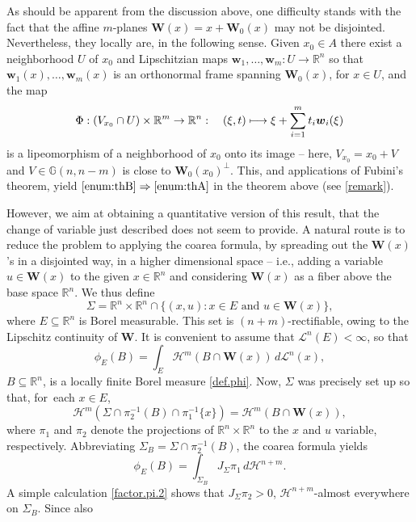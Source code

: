 \documentclass[11pt]{article}
\newcommand{\ie}{i.e.,\xspace}
\theoremstyle{definition}
\theoremstyle{jepanonymous}
\theoremstyle{plain}
\newcommand\mto{\mathchoice{\longmapsto}{\mapsto}{\mapsto}{\mapsto}}
\newcommand{\R}{\mathbb{R}}
\newcommand{\Rm}{\R^m}
\newcommand{\Rn}{\R^n}
\newcommand{\calH}{\mathscr{H}}
\newcommand{\calL}{\mathscr{L}}
\newcommand{\bW}{{\boldsymbol{W}}}
\newcommand{\bw}{{\boldsymbol{w}}}
\newcommand{\bG}{\mathbb{G}}
\let\subset\subseteq
\begin{document}
As should be apparent from the discussion above, one difficulty stands with the fact that the affine $m$-planes $\bW(x) = x + \bW_0(x)$ may not be disjointed.
Nevertheless, they locally are, in the following sense.
Given $x_0 \in A$ there exist a neighborhood $U$ of $x_0$ and Lipschitzian maps $\bw_1,\ldots,\bw_m: U \to \Rn$ so that $\bw_1(x),\ldots,\bw_m(x)$ is an orthonormal frame spanning $\bW_0(x)$, for $x \in U$, and the map
\[
\Phi: (V_{x_0} \cap U) \times \Rm \to \Rn:\quad (\xi,t) \mto \xi + \sum_{i=1}^m t_i \bw_i(\xi)
\]
is a lipeomorphism of a neighborhood of $x_0$ onto its image -- here, $V_{x_0} = x_0 + V$ and $V \in \bG(n,n-m)$ is close to $\bW_0(x_0)^\perp$.
This, and applications of Fubini's theorem, yield $\eqref{enum:thB} \Rightarrow \eqref{enum:thA}$ in the theorem above (see \ref{remark}).
\par
However, we aim at obtaining a quantitative version of this result, that the change of variable just described does not seem to provide.
A natural route is to reduce the problem to applying the coarea formula, by spreading out the $\bW(x)$'s in a disjointed way, in a higher dimensional space -- \ie adding a variable $u \in \bW(x)$ to the given $x \in \Rn$ and considering $\bW(x)$ as a fiber above the base space $\Rn$.
We thus define
\begin{equation*}
\Sigma = \Rn \times \Rn \cap \{ (x,u): x \in E \text{ and } u \in \bW(x) \},
\end{equation*}
where $E \subset \Rn$ is Borel measurable.
This set is $(n+m)$-rectifiable, owing to the Lipschitz continuity of $\bW$.
It is convenient to assume that $\calL^n(E) < \infty$, so that
\begin{equation}
\label{eq.01}
\phi_E(B) = \int_E \calH^m(B \cap \bW(x)) \,d\calL^n(x),
\end{equation}
$B \subset \Rn$, is a locally finite Borel measure \ref{def.phi}.
Now, $\Sigma$ was precisely set up so that, for~each $x \in E$,
\begin{equation*}
\calH^m(\Sigma \cap \pi_2^{-1}(B) \cap \pi_1^{-1}\{x\}) = \calH^m(B \cap \bW(x)),
\end{equation*}
where $\pi_1$ and $\pi_2$ denote the projections of $\Rn \times \Rn$ to the $x$ and $u$ variable, respectively.
Abbreviating $\Sigma_B = \Sigma \cap \pi_2^{-1}(B)$, the coarea formula yields
\begin{equation}
\label{eq.02}
\phi_E(B) = \int_{\Sigma_B} J_\Sigma \pi_1 \,d\calH^{n+m}.
\end{equation}
A simple calculation \ref{factor.pi.2} shows that $J_\Sigma \pi_2 > 0$, $\calH^{n+m}$-almost everywhere on $\Sigma_B$. Since also
\end{document}

